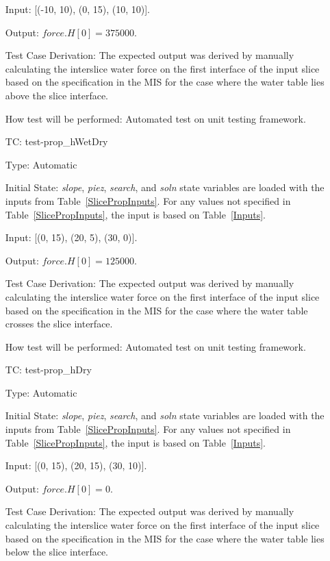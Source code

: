 \documentclass[12pt, titlepage]{article}
\newcounter{utestnum} %
\begin{document}
\begin{enumerate}[label=TC\arabic*:,ref={\arabic*}]
	Input: [(-10, 10), (0, 15), (10, 10)].
	
	Output: $\textit{force.H}[0] = 375000$.
	
	Test Case Derivation: The expected output was derived by manually 
	calculating the interslice water force on the first interface of the input 
	slice based on the specification in the MIS for the case where the water 
	table lies above the slice interface.
	
	How test will be performed: Automated test on unit testing framework.
	
	\item [TC\refstepcounter{utestnum}\theutestnum: 
	\label{TC_PropertyHWetDry}] 
	test-prop\_hWetDry
	
	Type: Automatic
	
	Initial State: \textit{slope}, \textit{piez}, \textit{search}, and 
	\textit{soln} state variables are loaded with the inputs from 
	Table~\ref{SlicePropInputs}. For any values not specified in 
	Table~\ref{SlicePropInputs}, the input is based on Table~\ref{Inputs}.
	
	Input: [(0, 15), (20, 5), (30, 0)].
	
	Output: $\textit{force.H}[0] = 125000$.
	
	Test Case Derivation: The expected output was derived by manually 
	calculating the interslice water force on the first interface of the input 
	slice based on the specification in the	MIS for the case where the water 
	table crosses the slice interface.
	
	How test will be performed: Automated test on unit testing framework.
	
	\item [TC\refstepcounter{utestnum}\theutestnum: 
	\label{TC_PropertyHDry}] 
	test-prop\_hDry
	
	Type: Automatic
	
	Initial State: \textit{slope}, \textit{piez}, \textit{search}, and 
	\textit{soln} state variables are loaded with the inputs from 
	Table~\ref{SlicePropInputs}. For any values not specified in 
	Table~\ref{SlicePropInputs}, the input is based on Table~\ref{Inputs}.
	
	Input: [(0, 15), (20, 15), (30, 10)].
	
	Output: $\textit{force.H}[0] = 0$.
	
	Test Case Derivation: The expected output was derived by manually 
	calculating the interslice water force on the first interface of the input 
	slice based on the specification in the MIS for the case where the water 
	table lies below the slice interface.
	

\end{enumerate}
\end{document}
